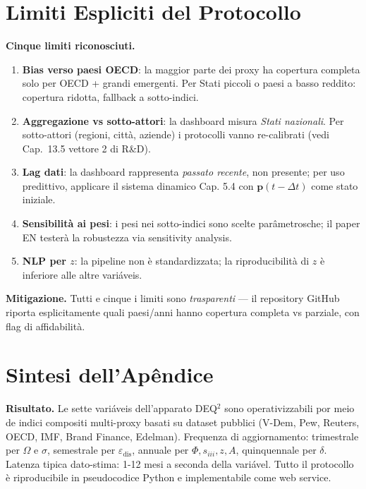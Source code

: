\section{Limiti Espliciti del
Protocollo}\label{limiti-espliciti-del-protocollo}

\Conj{} \textbf{Cinque limiti riconosciuti.}

\begin{enumerate}
\def\labelenumi{\arabic{enumi}.}
\tightlist
\item
  \textbf{Bias verso paesi OECD}: la maggior parte dei proxy ha
  copertura completa solo per OECD + grandi emergenti. Per Stati piccoli
  o paesi a basso reddito: copertura ridotta, fallback a sotto-indici.
\item
  \textbf{Aggregazione vs sotto-attori}: la dashboard misura \emph{Stati
  nazionali}. Per sotto-attori (regioni, città, aziende) i protocolli
  vanno re-calibrati (vedi Cap.~13.5 vettore 2 di R\&D).
\item
  \textbf{Lag dati}: la dashboard rappresenta \emph{passato recente},
  non presente; per uso predittivo, applicare il sistema dinamico Cap.
  5.4 con \(\boldsymbol{p}(t-\Delta t)\) come stato iniziale.
\item
  \textbf{Sensibilità ai pesi}: i pesi nei sotto-indici sono scelte
  parâmetrosche; il paper EN testerà la robustezza via sensitivity
  analysis.
\item
  \textbf{NLP per \(z\)}: la pipeline non è standardizzata; la
  riproducibilità di \(z\) è inferiore alle altre variáveis.
\end{enumerate}

\Proved{} \textbf{Mitigazione.} Tutti e cinque i limiti sono
\emph{trasparenti} --- il repository GitHub riporta esplicitamente quali
paesi/anni hanno copertura completa vs parziale, con flag di
affidabilità.



\section{Sintesi dell'Apêndice}\label{sintesi-dellapêndice}

\Proved{} \textbf{Risultato.} Le sette variáveis dell'apparato DEQ$^2$ sono
operativizzabili por meio de indici compositi multi-proxy basati su dataset
pubblici (V-Dem, Pew, Reuters, OECD, IMF, Brand Finance, Edelman).
Frequenza di aggiornamento: trimestrale per \(\Omega\) e \(\sigma\),
semestrale per \(\varepsilon_{\text{dis}}\), annuale per
\(\Phi, s_{iii}, z, A\), quinquennale per \(\delta\). Latenza tipica
dato-stima: 1-12 mesi a seconda della variável. Tutto il protocollo è
riproducibile in pseudocodice Python e implementabile come web service.

